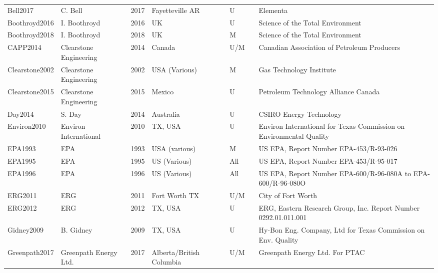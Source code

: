 \documentclass[11pt]{report}
\begin{document}
\begin{landscape}
\begin{table}[]
\begin{scriptsize}
\begin{tabular*}{1\columnwidth}{lllllll}
Bell2017         		& C. Bell      		& 2017 	& Fayetteville AR	& U     	&\cite{Bell2017}     & Elementa\\
Boothroyd2016     	& I. Boothroyd 	& 2016 	& UK   		& U     	& \cite{Boothroyd2016}& Science of the Total Environment      \\
Boothroyd2018     	& I. Boothroyd 	& 2018 	& UK   		& M     	& \cite{Boothroyd2018}        & Science of the Total Environment      \\
CAPP2014	& Clearstone Engineering & 2014 	& Canada         	& U/M   	& \cite{CAPP2014} & Canadian Association of Petroleum Producers     \\
Clearstone2002   	& Clearstone Engineering & 2002 	& USA (Various)  	& M     	& \cite{Clearstone2002}  & Gas Technology Institute    \\
Clearstone2015    	& Clearstone Engineering & 2015 	& Mexico         	& U     	& \cite{Clearstone2015}     & Petroleum Technology Alliance Canada  \\
Day2014 	& S. Day       		& 2014 	& Australia      		& U     	& \cite{Day2014}    & CSIRO Energy Technology     \\
Environ2010       	& Environ International  	& 2010 	& TX, USA        	& U     	& \cite{Environ2010}    & Environ International for Texas Commission on Environmental Quality \\
EPA1993 	& EPA		& 1993 	& USA (various)  	& M     	& \cite{EPA1993}       & US EPA, Report Number EPA-453/R-93-026\\
EPA1995 	& EPA		& 1995 	& US (Various)   	& All   	& \cite{EPA1995b} & US EPA, Report Number EPA-453/R-95-017\\
EPA1996 	& EPA		& 1996 	& US (Various)   	& All   	& \cite{EPA1996}     & US EPA, Report Number EPA-600/R-96-080A to EPA-600/R-96-080O        \\
ERG2011 	& ERG		& 2011 	& Fort Worth TX  	& U/M   	& \cite{ERG2011}     & City of Fort Worth\\
ERG2012 	& ERG		& 2012 	& TX, USA        	& U     	& \cite{ERG2012}         & ERG, Eastern Research Group, Inc. Report Number 0292.01.011.001     \\
Gidney2009        	& B. Gidney    		& 2009 	& TX, USA        	& U     	& \cite{Gidney2009}     & Hy-Bon Eng. Company, Ltd for Texas Commission on Env. Quality \\
Greenpath2017     	& Greenpath Energy Ltd.  & 2017 	& Alberta/British Columbia & U/M   	& \cite{Greenpath2017}   & Greenpath Energy Ltd. For PTAC        \\

\end{tabular*}
\end{scriptsize}
\end{table}
\end{landscape}
\end{document}
